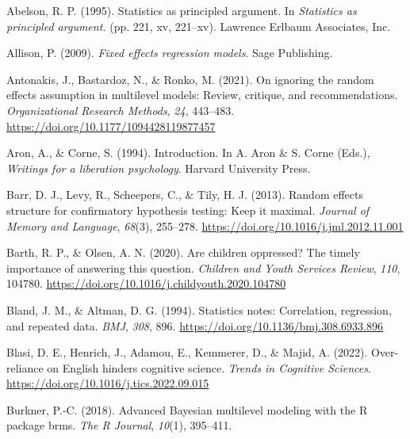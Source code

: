 \documentclass[
  letterpaper,
  DIV=11,
  numbers=noendperiod]{scrreprt}
\newlength{\cslhangindent}
\newlength{\cslentryspacingunit} %
\newenvironment{CSLReferences}[2] %
 {%
  \setlength{\parindent}{0pt}
  \ifodd #1
  \let\oldpar\par
  \def\par{\hangindent=\cslhangindent\oldpar}
  \fi
  \setlength{\parskip}{#2\cslentryspacingunit}
 }%
 {}
\begin{document}
\begin{CSLReferences}{1}{0}
\leavevmode{}%
Abelson, R. P. (1995). Statistics as principled argument. In
\emph{Statistics as principled argument.} (pp. 221, xv, 221--xv).
Lawrence Erlbaum Associates, Inc.

\leavevmode{}%
Allison, P. (2009). \emph{Fixed effects regression models}. Sage
Publishing.

\leavevmode{}%
Antonakis, J., Bastardoz, N., \& Ronko, M. (2021). On ignoring the
random effects assumption in multilevel models: Review, critique, and
recommendations. \emph{Organizational Research Methods}, \emph{24},
443--483. \url{https://doi.org/10.1177/1094428119877457}

\leavevmode{}%
Aron, A., \& Corne, S. (1994). Introduction. In A. Aron \& S. Corne
(Eds.), \emph{Writings for a liberation psychology}. Harvard University
Press.

\leavevmode{}%
Barr, D. J., Levy, R., Scheepers, C., \& Tily, H. J. (2013). Random
effects structure for confirmatory hypothesis testing: Keep it maximal.
\emph{Journal of Memory and Language}, \emph{68}(3), 255--278.
\url{https://doi.org/10.1016/j.jml.2012.11.001}

\leavevmode{}%
Barth, R. P., \& Olsen, A. N. (2020). Are children oppressed? The timely
importance of answering this question. \emph{Children and Youth Services
Review}, \emph{110}, 104780.
\url{https://doi.org/10.1016/j.childyouth.2020.104780}

\leavevmode{}%
Bland, J. M., \& Altman, D. G. (1994). Statistics notes: Correlation,
regression, and repeated data. \emph{BMJ}, \emph{308}, 896.
\url{https://doi.org/10.1136/bmj.308.6933.896}

\leavevmode{}%
Blasi, D. E., Henrich, J., Adamou, E., Kemmerer, D., \& Majid, A.
(2022). Over-reliance on {E}nglish hinders cognitive science.
\emph{Trends in Cognitive Sciences}.
\url{https://doi.org/10.1016/j.tics.2022.09.015}

\leavevmode{}%
Burkner, P.-C. (2018). Advanced {B}ayesian multilevel modeling with the
{R} package brms. \emph{The R Journal}, \emph{10}(1), 395--411.


\end{CSLReferences}
\end{document}
